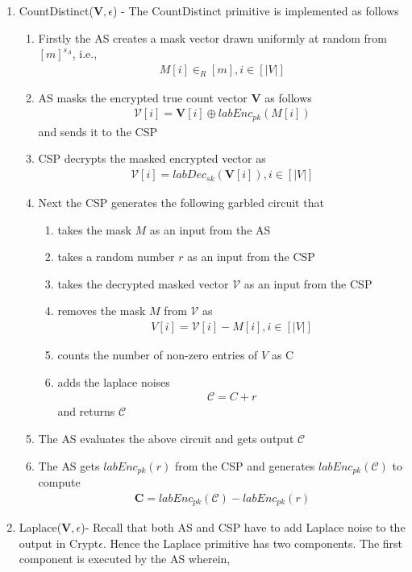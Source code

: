 \begin{enumerate}
\item \textsf{CountDistinct}($\mathbf{V},\epsilon$) - The \textsf{CountDistinct} primitive is implemented as follows \begin{enumerate}\item Firstly the \textsf{AS} creates a mask vector drawn uniformly at random from $[m]^{s_A}$, i.e.,  \begin{gather*} M[i] \in_R [m], i \in [|V|]\end{gather*} \item \textsf{AS} masks the encrypted true count vector $\mathbf{V}$  as follows \begin{gather*}\boldsymbol{\mathcal{V}}[i]= \mathbf{V}[i] \oplus labEnc_{pk}(M[i])\end{gather*} and sends it to the \textsf{CSP} \item \textsf{CSP} decrypts the masked encrypted vector as \begin{gather*}\mathcal{V}[i]=labDec_{sk}(\mathbf{V}[i]), i \in [|V|]\end{gather*} \item Next the \textsf{CSP} generates the following garbled circuit that\begin{enumerate}  \item takes the mask $M$ as an input from the \textsf{AS} \item takes a random number $r$  as an input from the \textsf{CSP}\item takes the decrypted masked vector $\mathcal{V}$ as an input from the \textsf{CSP} \item removes the mask $M$ from $\mathcal{V}$ as \begin{gather*}V[i]=\mathcal{V}[i]-M[i], i \in [|V|]\end{gather*}\item  counts the number of non-zero entries of $V$ as C \item adds the laplace noises \begin{gather*}\mathcal{C}=C+r\end{gather*} and returns $\mathcal{C}$ \end{enumerate} \item The \textsf{AS} evaluates the above circuit and gets output $\mathcal{C}$ \item The \textsf{AS} gets $labEnc_{pk}(r)$ from the \textsf{CSP} and generates $labEnc_{pk}(\mathcal{C})$ to compute\begin{gather*}\mathbf{C}=labEnc_{pk}(\mathcal{C})-labEnc_{pk}(r)\end{gather*} \end{enumerate} \item \textsf{Laplace}($\mathbf{V},\epsilon$)- Recall that both \textsf{AS} and \textsf{CSP} have to add Laplace noise to the output in Crypt$\epsilon$. Hence the \textsf{Laplace} primitive has two components. The first component is executed by the \textsf{AS} wherein,

\end{enumerate}
